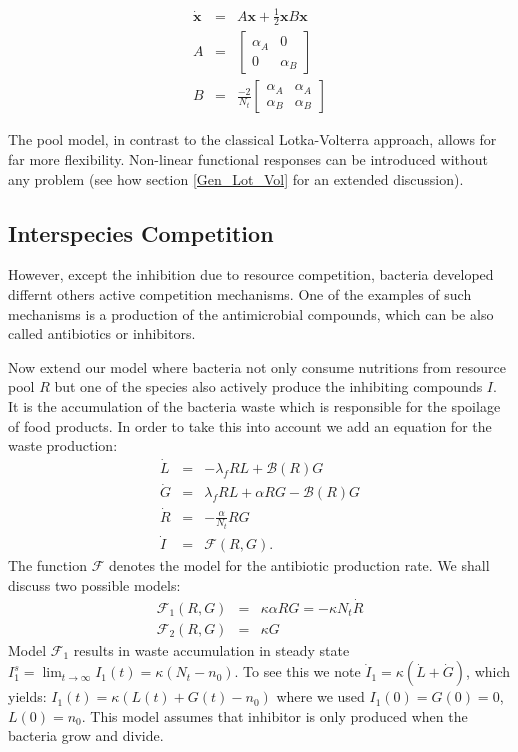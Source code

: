 \documentclass[10pt,A4paper]{article}
\begin{document}
\begin{eqnarray}
\dot{\mathbf{x}}&=&A\mathbf{x}+\frac{1}{2}\mathbf{x}B\mathbf{x}\\
A&=&
\begin{bmatrix}
\alpha_A&0\\
0 &\alpha_B
\end{bmatrix}\\
B&=&
\frac{-2}{N_t}\begin{bmatrix}
\alpha_A&\alpha_A\\
\alpha_B &\alpha_B
\end{bmatrix}
\end{eqnarray}

The pool model, in contrast to the classical Lotka-Volterra approach, allows for far more flexibility. 
Non-linear functional responses can be introduced without any problem (see how section \ref{Gen_Lot_Vol} for an extended discussion).


\subsection{Interspecies Competition}

However, except the inhibition due to resource competition, bacteria developed differnt others active competition mechanisms.
One of the examples of such mechanisms is a production of the antimicrobial compounds, which can be also called antibiotics or inhibitors.



Now extend our model where bacteria not only consume nutritions from resource pool $R$ but one of the species also actively produce the inhibiting compounds $I$. 
It is the accumulation of the bacteria waste which is responsible for the spoilage of food products. 
In order to take this into account we add an equation for the waste production:
\begin{eqnarray}
\dot{L} &=& - \lambda_f R L + \mathcal{B}(R)G\\
\dot{G} &=& \lambda_f R L +\alpha R G-\mathcal{B}(R)G\\
\dot{R} &=&-\frac{\alpha}{N_t} R G\\
\dot{I} &=& \mathcal{F}(R,G).
\end{eqnarray}
The function $\mathcal{F}$ denotes the model for the antibiotic production rate. 
We shall discuss two possible models:
\begin{eqnarray}
\mathcal{F}_1(R,G)&=&\kappa\alpha R G=-\kappa N_t\dot{R}\\
\mathcal{F}_2(R,G)&=&\kappa G
\end{eqnarray}
Model $\mathcal{F}_1$ results in waste accumulation in steady state $I_1^s=\lim_{t\to\infty}I_1(t)=\kappa(N_t-n_0)$. 
To see this we note $\dot{I}_1=\kappa(\dot{L}+\dot{G})$, which yields: $I_1(t)=\kappa(L(t)+G(t)-n_0)$ where we used $I_1(0)=G(0)=0$, $L(0)=n_0$. 
This model assumes that inhibitor is only produced when the bacteria grow and divide. \\
\end{document}
